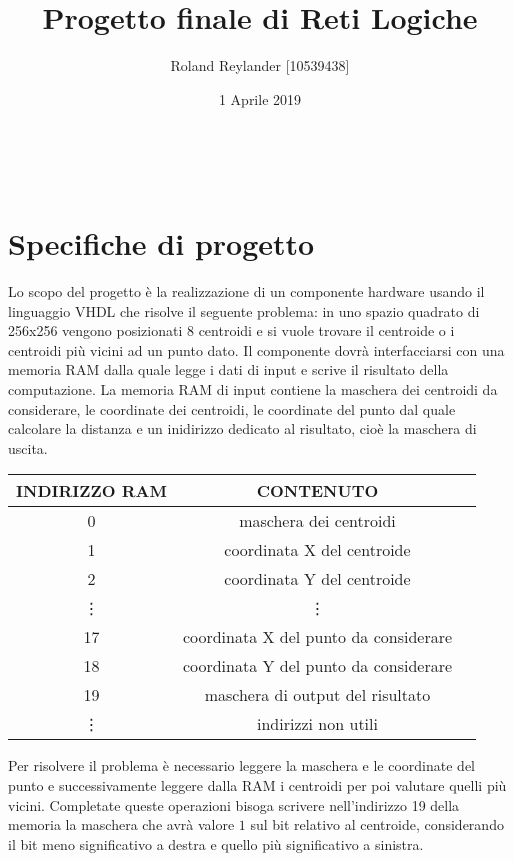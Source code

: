 \documentclass{article}
\title{Progetto finale di Reti Logiche}
\author{Roland Reylander [10539438]}
\date{1 Aprile 2019}
\begin{document}
\maketitle
\leavevmode
\\[20\baselineskip]
\tableofcontents


\pagebreak

\section{Specifiche di progetto}
Lo scopo del progetto \`e la realizzazione di un componente hardware usando il linguaggio VHDL che risolve il seguente problema: in uno spazio quadrato di 256x256 vengono posizionati 8 centroidi e si vuole trovare il centroide o i centroidi pi\`{u} vicini ad un punto dato.
\newline
Il componente dovr\`{a} interfacciarsi con una memoria RAM dalla quale legge i dati di input e scrive il risultato della computazione. La memoria RAM di input contiene la maschera dei centroidi da considerare, le coordinate dei centroidi, le coordinate del punto dal quale calcolare la distanza e un inidirizzo dedicato al risultato, cio\`{e} la maschera di uscita.
\newline

\renewcommand{\arraystretch}{1.5}
\begin{center}

\begin{tabular}{ |c|c|c| }
	\hline
	INDIRIZZO RAM & CONTENUTO \\ 
	\hline
	0 & maschera dei centroidi \\
	\hline
	1 & coordinata X del centroide \\
	\hline
	2 & coordinata Y del centroide \\
	\hline
	\vdots & \vdots \\
	\hline
	17 & coordinata X del punto da considerare \\
	\hline
	18 & coordinata Y del punto da considerare \\
	\hline
	19 & maschera di output del risultato \\
	\hline
	\vdots & indirizzi non utili \\
	\hline
\end{tabular}
\end{center}
\leavevmode\newline
Per risolvere il problema \`{e} necessario leggere la maschera e le coordinate del punto e successivamente leggere dalla RAM i centroidi per poi valutare quelli pi\`{u} vicini. Completate queste operazioni bisoga scrivere nell'indirizzo 19 della memoria la maschera che avr\`{a} valore $1$ sul bit relativo al centroide, considerando il bit meno significativo a destra e quello pi\`{u} significativo a sinistra.
\end{document}
